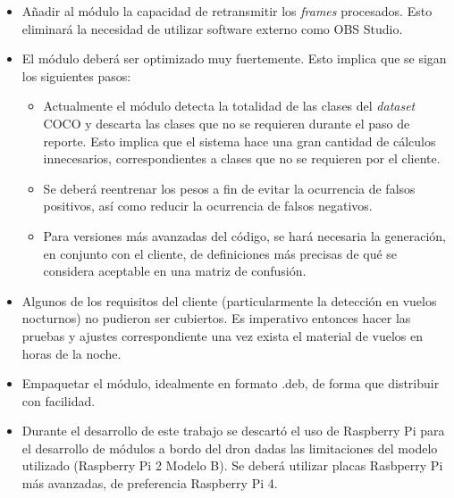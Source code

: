 \begin{itemize}

	\item Añadir al módulo la capacidad de retransmitir los \textit{frames} procesados. Esto eliminará la necesidad de utilizar software externo como OBS Studio.
	\item El módulo deberá ser optimizado muy fuertemente. Esto implica que se sigan los siguientes pasos:
	
	\begin{itemize}
		
		\item Actualmente el módulo detecta la totalidad de las clases del \textit{dataset} COCO y descarta las clases que no se requieren durante el paso de reporte. Esto implica que el sistema hace una gran cantidad de cálculos innecesarios, correspondientes a clases que no se requieren por el cliente. 		
		
		\item Se deberá reentrenar los pesos a fin de evitar la ocurrencia de falsos positivos, así como reducir la ocurrencia de falsos negativos.
		
		\item Para versiones más avanzadas del código, se hará necesaria la generación, en conjunto con el cliente, de definiciones más precisas de qué se considera aceptable en una matriz de confusión. 
		
	\end{itemize}
	
	\item Algunos de los requisitos del cliente (particularmente la detección en vuelos nocturnos) no pudieron ser cubiertos. Es imperativo entonces hacer las pruebas y ajustes correspondiente una vez exista el material de vuelos en horas de la noche.
	
	\item Empaquetar el módulo, idealmente en formato .deb, de forma que distribuir con facilidad. 
	
	\item Durante el desarrollo de este trabajo se descartó el uso de Raspberry Pi para el desarrollo de módulos a bordo del dron dadas las limitaciones del modelo utilizado (Raspberry Pi 2 Modelo B). Se deberá utilizar placas Rasbperry Pi más avanzadas, de preferencia Raspberry Pi 4. 

\end{itemize}